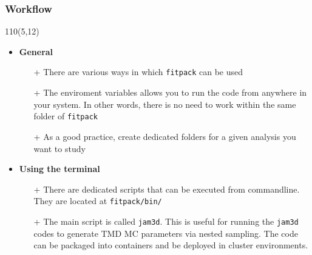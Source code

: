 \begin{frame}
\frametitle{\textbf{Workflow}}
\begin{textblock}{110}(5,12) 
\begin{itemize}
\item \textbf{General}
      \begin{itemize}
      \item[+] There are various ways in which  \texttt{fitpack} can be used 
      \item[+] The enviroment variables allows you to run the code
               from anywhere in your system. In other words, there is no need 
               to work within the same folder of \texttt{fitpack}
      \item[+] As a good practice, create dedicated folders for a
               given analysis you want to study 
      \end{itemize}
\item \textbf{Using the terminal }
      \begin{itemize}
      \item[+] There are dedicated scripts that can be executed from
               commandline. They are located at \texttt{fitpack/bin/}
      \item[+] The main script is called \texttt{jam3d}. This is
               useful for running the \texttt{jam3d} codes to generate TMD MC 
               parameters via nested sampling. The code can be
               packaged into  containers and be deployed in cluster 
               environments. 
      \end{itemize}

\end{itemize}

\end{textblock}
\end{frame}



